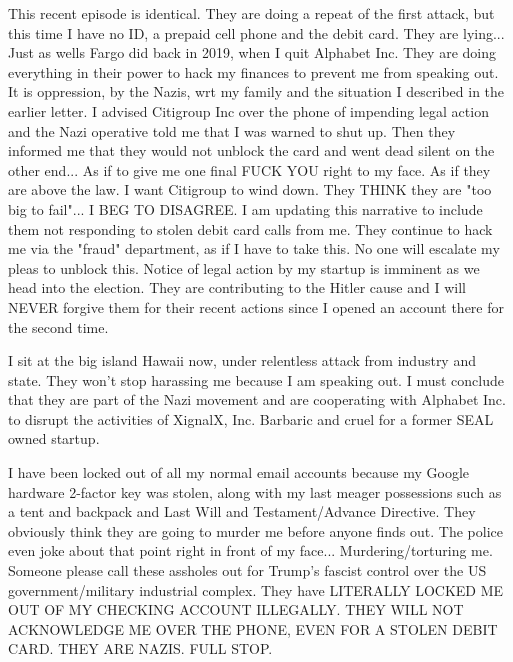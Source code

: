 \documentclass[a4paper]{arthur-letter}
\begin{document}
\begin{letter}
    This recent episode is identical. They are doing a repeat of the first attack, but this time I have no ID, a prepaid cell phone and the debit card. They are lying... Just as wells Fargo did back in 2019, when I quit Alphabet Inc. They are doing everything in their power to hack my finances to prevent me from speaking out. It is oppression, by the Nazis, wrt my family and the situation I described in the earlier letter. I advised Citigroup Inc over the phone of impending legal action and the Nazi operative told me that I was warned to shut up. Then they informed me that they would not unblock the card and went dead silent on the other end... As if to give me one final FUCK YOU right to my face. As if they are above the law. I want Citigroup to wind down. They THINK they are "too big to fail"... I BEG TO DISAGREE. I am updating this narrative to include them not responding to stolen debit card calls from me. They continue to hack me via the "fraud" department, as if I have to take this. No one will escalate my pleas to unblock this. Notice of legal action by my startup is imminent as we head into the election. They are contributing to the Hitler cause and I will NEVER forgive them for their recent actions since I opened an account there for the second time. 

    I sit at the big island Hawaii now, under relentless attack from industry and state. They won't stop harassing me because I am speaking out. I must conclude that they are part of the Nazi movement and are cooperating with Alphabet Inc. to disrupt the activities of XignalX, Inc. Barbaric and cruel for a former SEAL owned startup. 

    I have been locked out of all my normal email accounts because my Google hardware 2-factor key was stolen, along with my last meager possessions such as a tent and backpack and Last Will and Testament/Advance Directive. They obviously think they are going to murder me before anyone finds out. The police even joke about that point right in front of my face... Murdering/torturing me. Someone please call these assholes out for Trump's fascist control over the US government/military industrial complex. They have LITERALLY LOCKED ME OUT OF MY CHECKING ACCOUNT ILLEGALLY. THEY WILL NOT ACKNOWLEDGE ME OVER THE PHONE, EVEN FOR A STOLEN DEBIT CARD. THEY ARE NAZIS. FULL STOP.
    

\end{letter}
\end{document}
